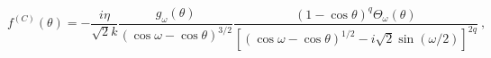 \begin{equation}
\label{fc}
f^{(C)}(\theta)= -\frac{i\eta}{\sqrt2 k}\frac{g_\omega(\theta)}{(\cos\omega- \cos\theta)^{3/2}}\frac{(1-\cos\theta)^q\Theta_\omega(\theta)}{[(\cos\omega-\cos\theta)^{1/2}
-i\sqrt2\sin(\omega/2)]^{2q}} \ ,
\end{equation}

